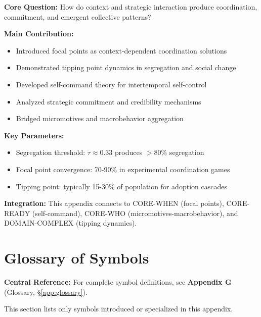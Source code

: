 \begin{tcolorbox}[colback=green!10!white, colframe=green!75!black,
    title=\textbf{Appendix TS: Summary}]

\textbf{Core Question:} How do context and strategic interaction produce
coordination, commitment, and emergent collective patterns?

\textbf{Main Contribution:}
\begin{itemize}[nosep]
    \item Introduced focal points as context-dependent coordination solutions
    \item Demonstrated tipping point dynamics in segregation and social change
    \item Developed self-command theory for intertemporal self-control
    \item Analyzed strategic commitment and credibility mechanisms
    \item Bridged micromotives and macrobehavior aggregation
\end{itemize}

\textbf{Key Parameters:}
\begin{itemize}[nosep]
    \item Segregation threshold: $\tau \approx 0.33$ produces $>80\%$ segregation
    \item Focal point convergence: 70-90\% in experimental coordination games
    \item Tipping point: typically 15-30\% of population for adoption cascades
\end{itemize}

\textbf{Integration:} This appendix connects to CORE-WHEN (focal points),
CORE-READY (self-command), CORE-WHO (micromotives-macrobehavior), and
DOMAIN-COMPLEX (tipping dynamics).

\end{tcolorbox}


\section{Glossary of Symbols}
\label{sec:ts-glossary}

\begin{tcolorbox}[colback=blue!5!white, colframe=blue!75!black]
\textbf{Central Reference:} For complete symbol definitions, see
\textbf{Appendix G} (Glossary, \S\ref{app:glossary}).

This section lists only symbols introduced or specialized in this appendix.
\end{tcolorbox}

